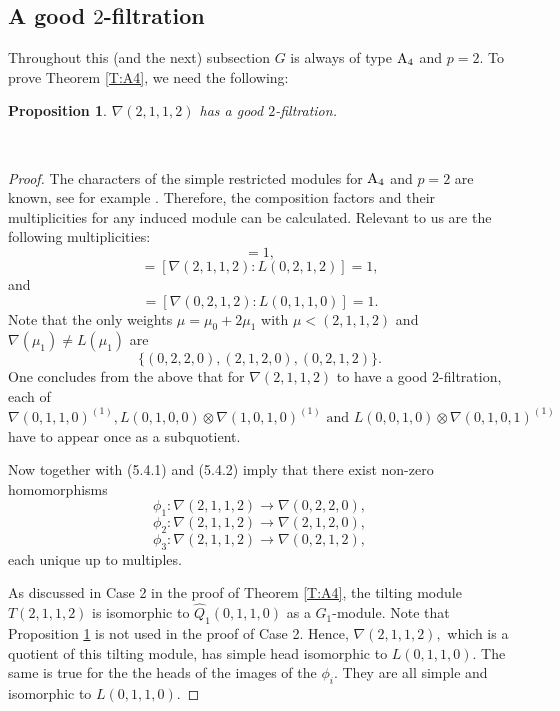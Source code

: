 \documentclass[twoside,11pt,reqno]{amsart}
\newcommand{\0}{\bar 0}
\newcommand{\1}{\bar 1}
\newcommand{\hQ}{\widehat{Q}}
\newtheorem{prop}{Proposition}[subsection]
\theoremstyle{definition}
\numberwithin{equation}{subsection}
\begin{document}
\subsection{A good $2$-filtration}
Throughout this (and the next) subsection $G$ is always of type $\rm{A}_4$ and $p=2.$ To prove Theorem \ref{T:A4}, we need the following:
﻿
\begin{prop}\label{P:Filtration}
$\nabla(2,1,1,2)$ has a good $2$-filtration.
\end{prop}
﻿
\begin{proof}
The characters of the simple restricted modules for $\rm{A}_4$ and $p=2$ are known, see for example \cite[Table III.A.5]{DS}. Therefore, the composition factors and their multiplicities for any induced module can be calculated. Relevant to us are the following multiplicities:
\begin{equation} 
[\nabla(2,1,1,2):L(0,2,2,0)]=1,
\end{equation}
\begin{equation} 
[\nabla(2,1,1,2):L(2,1,2,0)]=[\nabla(2,1,1,2):L(0,2,1,2)]=1,
\end{equation}
and 
\begin{equation} 
[\nabla(2,1,2,0):L(0,1,1,0)]=[\nabla(0,2,1,2):L(0,1,1,0)]=1.
\end{equation}
Note that the only weights $\mu = \mu_0 +2 \mu_1$ with $\mu < (2,1,1,2)$ and $\nabla(\mu_1) \neq L(\mu_1)$ are $$\{(0,2,2,0),  (2,1,2,0), (0,2,1,2) \}.$$
One concludes from the above that for  $\nabla(2,1,1,2)$ to have a good $2$-filtration, each of  
$\displaystyle{\nabla(0,1,1,0)^{(1)},  L(0,1,0,0) \otimes \nabla(1,0,1,0)^{(1)} \text{ and } L(0,0,1,0) \otimes \nabla(0,1,0,1)^{(1)}}$ have to appear once as a subquotient.


Now  \cite[Theorem 7.1]{Kop} together with  (5.4.1) and (5.4.2) imply that there exist non-zero homomorphisms
$$\phi_1:\nabla(2,1,1,2) \to \nabla(0,2,2,0),$$
 $$\phi_2: \nabla(2,1,1,2) \to \nabla(2,1,2,0),$$
 $$\phi_3: \nabla(2,1,1,2) \to \nabla(0,2,1,2),$$
 each unique up to multiples.
 
As discussed in Case 2 in the proof of Theorem \ref{T:A4}, the tilting module  $T(2,1,1,2)$ is isomorphic to $\hQ_{1}(0,1,1,0)$ as a $G_1$-module. Note that Proposition \ref{P:Filtration} is not used in the proof of Case 2. Hence, $\nabla(2,1,1,2),$ which is a quotient of this tilting module, has simple head isomorphic to $L(0,1,1,0).$
 The same is true for the the heads of the images of the $\phi_i.$ They are all simple and isomorphic to $L(0,1,1,0).$


\end{proof}
\end{document}
